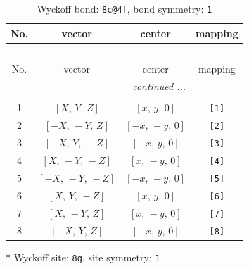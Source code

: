 \documentclass[fleqn,8pt]{jsarticle}
\begin{document}
\renewcommand{\arraystretch}{1.2}
\begin{longtable}{cccc}
\caption{Wyckoff bond: {\tt 8c@4f}, bond symmetry: {\tt 1}}
 \\
 \hline \hline
No. & vector & center & mapping \\ \hline \endfirsthead

\multicolumn{3}{l}{\tablename\ \thetable{}} \\
 \hline \hline
No. & vector & center & mapping \\ \hline \endhead

 \hline \hline
\multicolumn{3}{r}{\footnotesize\it continued ...} \\ \endfoot

 \hline \hline
\multicolumn{3}{r}{} \\ \endlastfoot

1 & $\left[ X,\, Y,\, Z \right]$ & $\left[ x,\, y,\, 0 \right]$ & {\tt [1]} \\ \hline
2 & $\left[ - X,\, - Y,\, Z \right]$ & $\left[ - x,\, - y,\, 0 \right]$ & {\tt [2]} \\ \hline
3 & $\left[ - X,\, Y,\, - Z \right]$ & $\left[ - x,\, y,\, 0 \right]$ & {\tt [3]} \\ \hline
4 & $\left[ X,\, - Y,\, - Z \right]$ & $\left[ x,\, - y,\, 0 \right]$ & {\tt [4]} \\ \hline
5 & $\left[ - X,\, - Y,\, - Z \right]$ & $\left[ - x,\, - y,\, 0 \right]$ & {\tt [5]} \\ \hline
6 & $\left[ X,\, Y,\, - Z \right]$ & $\left[ x,\, y,\, 0 \right]$ & {\tt [6]} \\ \hline
7 & $\left[ X,\, - Y,\, Z \right]$ & $\left[ x,\, - y,\, 0 \right]$ & {\tt [7]} \\ \hline
8 & $\left[ - X,\, Y,\, Z \right]$ & $\left[ - x,\, y,\, 0 \right]$ & {\tt [8]} \\
\end{longtable}
* Wyckoff site: {\tt 8g}, site symmetry: {\tt 1}
\renewcommand{\arraystretch}{1.2}
\end{document}
